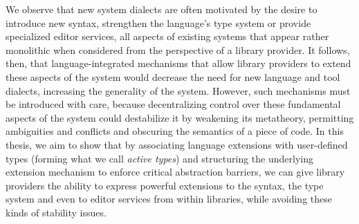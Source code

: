 We observe that new system dialects are often motivated by the desire to introduce new syntax, strengthen the language's type system or provide specialized editor services, all aspects of existing systems that appear rather monolithic when considered from the perspective of a library provider. %
It follows, then, that {language-integrated mechanisms} that allow library providers to extend these aspects of the system would decrease the need for new language and tool dialects, increasing the generality of the  system. However, such mechanisms must be introduced with care, because decentralizing control over these fundamental aspects of the system could destabilize it by weakening its metatheory, permitting ambiguities and conflicts and obscuring the semantics of a piece of code. 
In this thesis, we aim to show that by associating language extensions with user-defined types (forming what we call \emph{active types}) and structuring the underlying extension mechanism to enforce critical  abstraction barriers, we can give library providers the ability to express powerful extensions to the syntax, the type system and even to editor services from within libraries, while avoiding these kinds of stability issues. %

